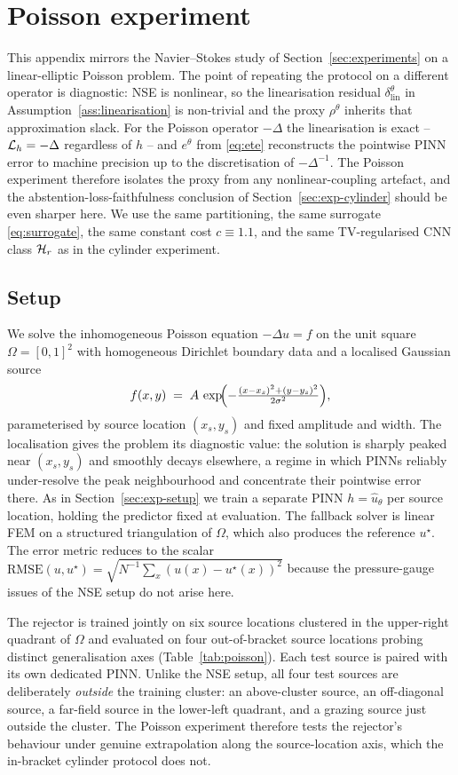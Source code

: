 \section{Poisson experiment}
\label{app:poisson}

This appendix mirrors the Navier--Stokes study of
Section~\ref{sec:experiments} on a linear-elliptic Poisson problem.
The point of repeating the protocol on a different operator is
diagnostic: NSE is nonlinear, so the linearisation residual
$\delta_{\mathrm{lin}}^\theta$ in
Assumption~\ref{ass:linearisation} is non-trivial and the proxy
$\rho^\theta$ inherits that approximation slack. For the Poisson
operator $-\Delta$ the linearisation is exact -- $\mathcal{L}_h=-\Delta$
regardless of $h$ -- and $e^\theta$ from \eqref{eq:ete} reconstructs
the pointwise PINN error to machine precision up to the
discretisation of $-\Delta^{-1}$. The Poisson experiment therefore
isolates the proxy from any nonlinear-coupling artefact, and the
abstention-loss-faithfulness conclusion of
Section~\ref{sec:exp-cylinder} should be even sharper here. We use
the same partitioning, the same surrogate \eqref{eq:surrogate}, the
same constant cost $c\equiv 1.1$, and the same TV-regularised CNN
class $\mathcal{H}_r$ as in the cylinder experiment.

\subsection{Setup}

We solve the inhomogeneous Poisson equation $-\Delta u=f$ on the
unit square $\Omega=[0,1]^2$ with homogeneous Dirichlet boundary
data and a localised Gaussian source
\[
  f(x,y)\;=\;A\,\exp\!\Bigl(-\tfrac{(x-x_s)^2+(y-y_s)^2}{2\sigma^2}\Bigr),
\]
parameterised by source location $(x_s,y_s)$ and fixed amplitude and
width. The localisation gives the problem its diagnostic value: the
solution is sharply peaked near $(x_s,y_s)$ and smoothly decays
elsewhere, a regime in which PINNs reliably under-resolve the peak
neighbourhood and concentrate their pointwise error there. As in
Section~\ref{sec:exp-setup} we train a separate PINN
$h=\widehat{u}_\theta$ per source location, holding the predictor
fixed at evaluation. The fallback solver is linear FEM on a
structured triangulation of $\Omega$, which also produces the
reference $u^\star$. The error metric reduces to the scalar
$\mathrm{RMSE}(u,u^\star)=\sqrt{N^{-1}\sum_x(u(x)-u^\star(x))^2}$
because the pressure-gauge issues of the NSE setup do not arise
here.

The rejector is trained jointly on six source locations clustered
in the upper-right quadrant of $\Omega$ and evaluated on four
out-of-bracket source locations probing distinct generalisation
axes (Table~\ref{tab:poisson}). Each test source is paired with its
own dedicated PINN. Unlike the NSE setup, all four test sources are
deliberately \emph{outside} the training cluster: an above-cluster
source, an off-diagonal source, a far-field source in the
lower-left quadrant, and a grazing source just outside the
cluster. The Poisson experiment therefore tests the rejector's
behaviour under genuine extrapolation along the source-location
axis, which the in-bracket cylinder protocol does not.

